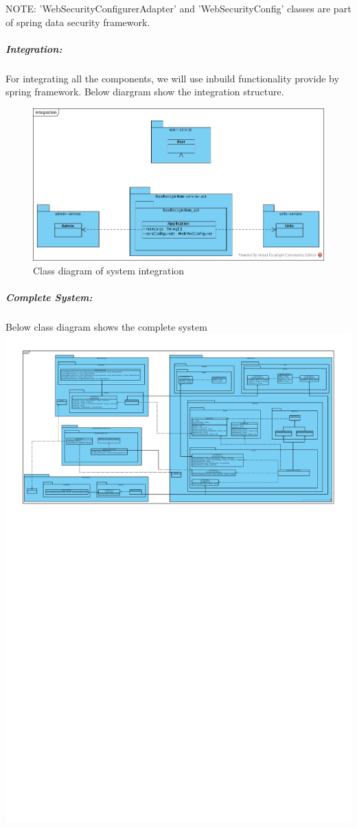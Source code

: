 \documentclass[a4paper,11pt]{article}
\begin{document}
NOTE: 'WebSecurityConfigurerAdapter' and 'WebSecurityConfig' classes are part of spring data security framework.

\subparagraph{Integration: } For integrating all the components, we will use inbuild functionality provide by spring framework. Below diargram show the integration structure.

\begin{figure}[ht!]
    \centering
	\includegraphics[width=130mm]{ClassDiagrams/new/integration.jpg}
		\caption{Class diagram of system integration}
\end{figure}

\newpage
\subparagraph{Complete System: } Below class diagram shows the complete system
		\centering
	\includegraphics[scale=0.8]{ClassDiagrams/new/system.pdf}
\end{document}
